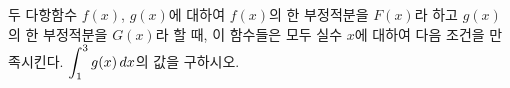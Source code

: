두 다항함수 $f(x)$, $g(x)$에 대하여 $f(x)$의 한 부정적분을 $F(x)$라 하고 $g(x)$의 한 부정적분을 $G(x)$라 할 때, 이 함수들은 모두 실수 $x$에 대하여 다음 조건을 만족시킨다. \noindent $\displaystyle\int_{1}^{3}g(x)\mkern3mu dx$의 값을 구하시오.
